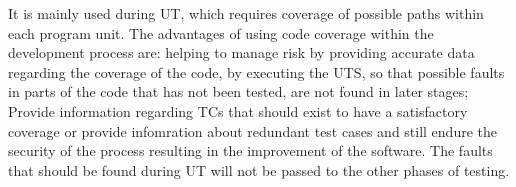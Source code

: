{It is mainly used during \ac{UT}, which requires coverage of possible paths within each program unit.
The advantages of using code coverage within the development process are: helping to manage risk by providing accurate
data regarding the coverage of the code, by executing the \ac{UTS}, so that possible faults in parts of the code that has not been tested, are not found in later stages;
Provide information regarding \ac{TC}s that should exist to have a satisfactory coverage or provide infomration about redundant test cases
and still endure the security of the process resulting in the improvement of the software.
The faults that should be found during \ac{UT} will not be passed to the other phases of testing.\\

\cite{mcdc}
\cite{Marick99}
}
